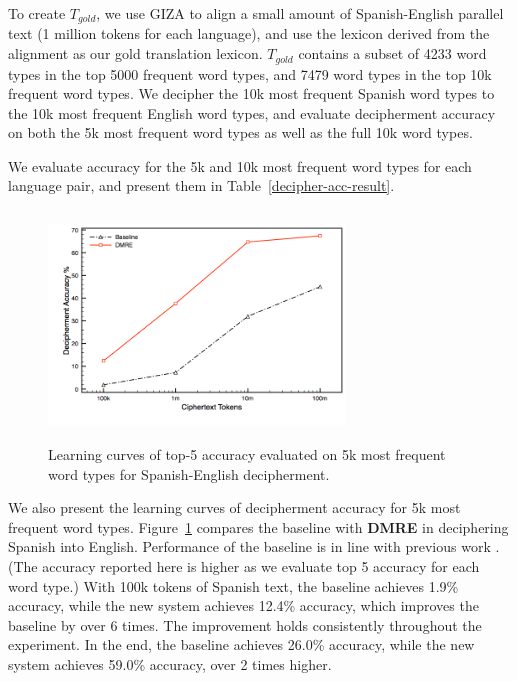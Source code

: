 To create $T_{gold}$, we use GIZA to align a small amount of Spanish-English parallel text (1 million tokens for each language), and use the lexicon derived from the alignment as our gold translation lexicon. $T_{gold}$ contains a subset of 4233 word types in the top 5000 frequent word types, and 7479 word types in the top 10k frequent word types. We decipher the 10k most frequent Spanish word types to the 10k most frequent English word types, and evaluate decipherment accuracy on both the 5k most frequent word types as well as the full 10k word types.

 We evaluate accuracy for the 5k and 10k most frequent word types for each language pair, and present them in Table~\ref{decipher-acc-result}.


 \begin{figure}[!ht]
  \centering
  \includegraphics[width=3.1in,height=2.4in]{es_en_curve}
  \caption{Learning curves of top-5 accuracy evaluated on 5k most frequent word types for Spanish-English decipherment.}
\label{es-en-curve}
\end{figure}

We also present the learning curves of decipherment accuracy for 5k most frequent word types. Figure~\ref{es-en-curve} compares the baseline with \textbf{DMRE} in deciphering Spanish into English. Performance of the baseline is in line with previous work \cite{dou-knight:2013:EMNLP}. (The accuracy reported here is higher as we evaluate top 5 accuracy for each word type.) With 100k tokens of Spanish text, the baseline achieves 1.9\% accuracy, while the new system achieves 12.4\% accuracy, which improves the baseline by over 6 times. The improvement holds consistently throughout the experiment. In the end, the baseline achieves 26.0\% accuracy, while the new system achieves 59.0\% accuracy, over 2 times higher. 

